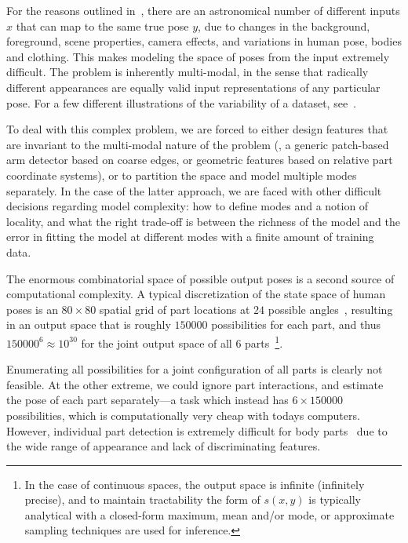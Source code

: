  For the reasons outlined 
in~, there are an astronomical number of different inputs 
$x$ that can map to the same true pose $y$, due to changes in the background, 
foreground, scene properties, camera effects, and variations in human pose, 
bodies and clothing.  This makes modeling the space of poses from the input 
extremely difficult.  The problem is inherently multi-modal, in the sense that 
radically different appearances are equally valid input representations of any 
particular pose.  For a few different illustrations of the variability of a 
dataset, see~. 

To deal with this complex problem, we are forced to either design features that 
are invariant to the multi-modal nature of the problem (\eg, a generic 
patch-based arm detector based on coarse edges, or geometric features based on 
relative part coordinate systems), or to partition the space and model multiple 
modes separately.  In the case of the latter approach, we are faced with other 
difficult decisions regarding model complexity: how to define modes and a 
notion of locality, and what the right trade-off is between the richness of the 
model and the error in fitting the model at different modes with a finite 
amount of training data.

The enormous combinatorial space of possible output poses is a second source of 
computational complexity.  A typical discretization of the state space of human 
poses is an $80 \times 80$ spatial grid of part locations at $24$ possible 
angles~\citep{felz05}, resulting in an output space that is roughly $150000$ 
possibilities for each part, and thus $150000^6 \approx 10^{30}$ for the joint 
output space of all $6$ parts~\footnote{In the case of continuous spaces, the 
output space is infinite (infinitely precise), and to maintain tractability the 
form of $s(x,y)$ is typically analytical with a closed-form maximum, mean 
and/or mode, or approximate sampling techniques are used for inference.}.

Enumerating all possibilities for a joint configuration of all parts is clearly 
not feasible.  At the other extreme, we could ignore part interactions, and 
estimate the pose of each part separately---a task which instead has $6 \times 
150000$ possibilities, which is computationally very cheap with todays 
computers.  However, individual part detection is extremely difficult for body 
parts~\citep{andriluka09} due to the wide range of appearance and lack of 
discriminating features.

